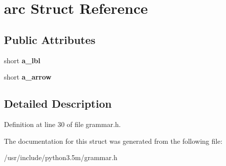 \hypertarget{structarc}{}\section{arc Struct Reference}
\label{structarc}
\subsection*{Public Attributes}
\begin{DoxyCompactItemize}
\item 
short {\bfseries a\+\_\+lbl}\hypertarget{structarc_a2febdfa7daf772d89eaa0951933dbf74}{}\label{structarc_a2febdfa7daf772d89eaa0951933dbf74}

\item 
short {\bfseries a\+\_\+arrow}\hypertarget{structarc_afbb7259f5917c22500ffce95ed89f644}{}\label{structarc_afbb7259f5917c22500ffce95ed89f644}

\end{DoxyCompactItemize}


\subsection{Detailed Description}


Definition at line 30 of file grammar.\+h.



The documentation for this struct was generated from the following file\+:\begin{DoxyCompactItemize}
\item 
/usr/include/python3.\+5m/grammar.\+h\end{DoxyCompactItemize}
